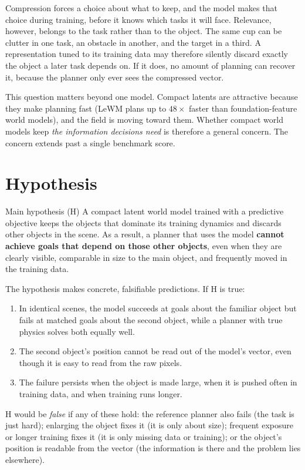 \documentclass[11pt]{article}
\begin{document}
Compression forces a choice about what to keep, and the model makes that choice during training, before it knows which tasks it will face. Relevance, however, belongs to the task rather than to the object. The same cup can be clutter in one task, an obstacle in another, and the target in a third. A representation tuned to its training data may therefore silently discard exactly the object a later task depends on. If it does, no amount of planning can recover it, because the planner only ever sees the compressed vector.

This question matters beyond one model. Compact latents are attractive because they make planning fast (LeWM plans up to $48\times$ faster than foundation-feature world models), and the field is moving toward them. Whether compact world models keep \emph{the information decisions need} is therefore a general concern. The concern extends past a single benchmark score.

\section{Hypothesis}

\begin{hyp}{Main hypothesis (H)}
A compact latent world model trained with a predictive objective keeps the objects that dominate its training dynamics and discards other objects in the scene. As a result, a planner that uses the model \textbf{cannot achieve goals that depend on those other objects}, even when they are clearly visible, comparable in size to the main object, and frequently moved in the training data.
\end{hyp}

\noindent The hypothesis makes concrete, falsifiable predictions. If H is true:
\begin{enumerate}[label=\textbf{P\arabic*.}]
  \item In identical scenes, the model succeeds at goals about the familiar object but fails at matched goals about the second object, while a planner with true physics solves both equally well.
  \item The second object's position cannot be read out of the model's vector, even though it is easy to read from the raw pixels.
  \item The failure persists when the object is made large, when it is pushed often in training data, and when training runs longer.
\end{enumerate}
H would be \emph{false} if any of these hold: the reference planner also fails (the task is just hard); enlarging the object fixes it (it is only about size); frequent exposure or longer training fixes it (it is only missing data or training); or the object's position is readable from the vector (the information is there and the problem lies elsewhere).
\end{document}
